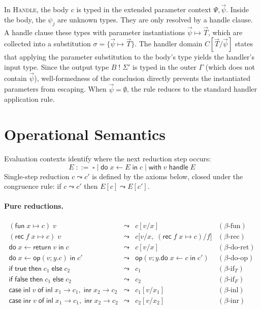 \documentclass{article}
\theoremstyle{definition}
\theoremstyle{remark}
\newcommand{\comp}[2]{#1\;!\;#2}
\newcommand{\op}{\mathsf{op}}
\newcommand{\ret}{\mathsf{return}\;}
\newcommand{\ddo}{\mathsf{do}\;}
\newcommand{\iin}{\;\mathsf{in}\;}
\newcommand{\iif}{\mathsf{if}\;}
\newcommand{\then}{\;\mathsf{then}\;}
\newcommand{\eelse}{\;\mathsf{else}\;}
\newcommand{\ccase}{\mathsf{case}\;}
\newcommand{\oof}{\;\mathsf{of}\;}
\newcommand{\inl}{\mathsf{inl}\;}
\newcommand{\inr}{\mathsf{inr}\;}
\newcommand{\fun}{\mathsf{fun}\;}
\newcommand{\rec}{\mathsf{rec}\;}
\newcommand{\with}{\mathsf{with}\;}
\newcommand{\handle}{\;\mathsf{handle}\;}
\newcommand{\G}{\Gamma}
\newcommand{\Sig}{\Sigma}
\begin{document}
In \textsc{Handle}, the body $c$ is typed in the extended parameter context $\Psi, \vec{\psi}$.
Inside the body, the $\psi_j$ are unknown types. They are only resolved by a handle clause.
A handle clause these types with parameter instantiations $\vec{\psi} \mapsto \vec{T}$,
which are collected into a substitution $\sigma = \{\vec{\psi} \mapsto \vec{T}\}$.
The handler domain $C[\vec{T} / \vec{\psi}]$ states that applying the parameter substitution to the body's type yields the handler's input type.
Since the output type $\comp{B}{\Sig'}$ is typed in the outer $\G$ (which does not contain $\vec{\psi}$),
well-formedness of the conclusion directly prevents the instantiated parameters from escaping.
When $\vec{\psi} = \emptyset$, the rule reduces to the standard handler application rule.

\section{Operational Semantics}\label{sec:opsem}

Evaluation contexts identify where the next reduction step occurs:
\[
  E \;::=\; \square
    \mid \ddo x \leftarrow E \iin c
    \mid \with v \handle E
\]
Single-step reduction $c \leadsto c'$ is defined by the axioms below, closed under the congruence rule: if $c \leadsto c'$ then $E[c] \leadsto E[c']$.

\paragraph{Pure reductions.}
\[
\begin{array}{lcll}
  (\fun x \mapsto c)\;v
    & \leadsto & c[v/x]
    & (\beta\text{-fun}) \\[4pt]
  (\rec f\;x \mapsto c)\;v
    & \leadsto & c\bigl[v/x,\;(\rec f\;x \mapsto c)/f\bigr]
    & (\beta\text{-rec}) \\[4pt]
  \ddo x \leftarrow \ret v \iin c
    & \leadsto & c[v/x]
    & (\beta\text{-do-ret}) \\[4pt]
  \ddo x \leftarrow \op(v; y.c) \iin c'
    & \leadsto & \op(v; y.\ddo x \leftarrow c \iin c')
    & (\beta\text{-do-op}) \\[4pt]
  \iif \mathsf{true} \then c_1 \eelse c_2
    & \leadsto & c_1
    & (\beta\text{-if}_T) \\[4pt]
  \iif \mathsf{false} \then c_1 \eelse c_2
    & \leadsto & c_2
    & (\beta\text{-if}_F) \\[4pt]
  \ccase \inl v \oof \inl x_1 \to c_1,\;\inr x_2 \to c_2
    & \leadsto & c_1[v/x_1]
    & (\beta\text{-inl}) \\[4pt]
  \ccase \inr v \oof \inl x_1 \to c_1,\;\inr x_2 \to c_2
    & \leadsto & c_2[v/x_2]
    & (\beta\text{-inr})
\end{array}
\]
\end{document}
